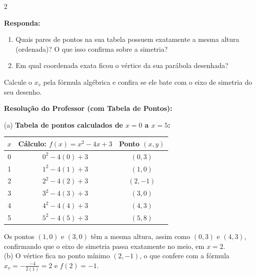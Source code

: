 \begin{multicols*}{2}
\begin{boxresponda}
\textbf{Responda:} 
\begin{enumerate}[label=\alph*), itemsep=\espacoAlt]
\item Quais pares de pontos na sua tabela possuem exatamente a mesma altura (ordenada)? O que isso confirma sobre a simetria?
\item Em qual coordenada exata ficou o vértice da sua parábola desenhada?
\end{enumerate}
\end{boxresponda}

\begin{boxdica}
Calcule o $x_v$ pela fórmula algébrica e confira se ele bate com o eixo de simetria do seu desenho.
\end{boxdica}

\ifgabarito
    \begin{tcolorbox}[colback=CorTitUm!5, colframe=CorTitUm, boxrule=1pt, arc=4pt, left=6pt, right=6pt, top=6pt, bottom=6pt]
    \small\textbf{\textcolor{CorTitUm}{Resolução do Professor (com Tabela de Pontos):}}\par\vspace{0.1cm}
    \color{CinzaEscuro}
    (a) \textbf{Tabela de pontos calculados de $x=0$ a $x=5$:}
    \begin{center}
    \small
    \begin{tabular}{|c|c|c|}
    \hline
    \textbf{$x$} & \textbf{Cálculo: $f(x) = x^2 - 4x + 3$} & \textbf{Ponto $(x, y)$} \\ \hline
    0 & $0^2 - 4(0) + 3$ & $(0, 3)$ \\ \hline
    1 & $1^2 - 4(1) + 3$ & $(1, 0)$ \\ \hline
    2 & $2^2 - 4(2) + 3$ & $(2, -1)$ \\ \hline
    3 & $3^2 - 4(3) + 3$ & $(3, 0)$ \\ \hline
    4 & $4^2 - 4(4) + 3$ & $(4, 3)$ \\ \hline
    5 & $5^2 - 4(5) + 3$ & $(5, 8)$ \\ \hline
    \end{tabular}
    \end{center}
    Os pontos $(1,0)$ e $(3,0)$ têm a mesma altura, assim como $(0,3)$ e $(4,3)$, confirmando que o eixo de simetria passa exatamente no meio, em $x=2$. \\
    (b) O vértice fica no ponto mínimo $(2, -1)$, o que confere com a fórmula $x_v = -\frac{-4}{2(1)} = 2$ e $f(2)=-1$.
    \end{tcolorbox}
\fi


\end{multicols*}
